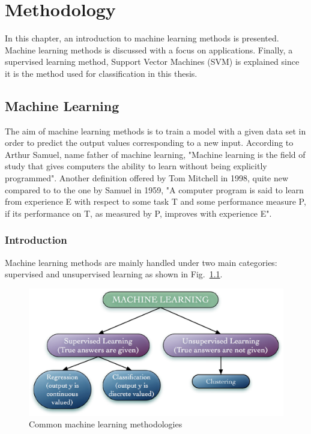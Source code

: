 \chapter{Methodology}

In this chapter, an introduction to machine learning methods is presented. 
Machine learning methods is discussed with a focus on applications.
Finally, a supervised learning method, Support Vector Machines (SVM) is explained since it is the method used for classification in this thesis.

\section{Machine Learning}

The aim of machine learning methods is to train a model with a given data set in order to predict the output values corresponding to a new input. 
According to Arthur Samuel, name father of machine learning, "Machine learning is the field of study that gives computers the ability to learn without being explicitly programmed". 
Another definition offered by Tom Mitchell in 1998, quite new compared to to the one by Samuel in 1959, "A computer program is said to learn from experience E with respect to some task T and some performance measure P, if its performance on T, as measured by P, improves with experience E".

\subsection{Introduction}
Machine learning methods are mainly handled under two main categories: supervised and unsupervised learning as shown in Fig.~\ref{fig:machineLearningMethodsSerious}. 

\begin{figure}
\begin{center}
\includegraphics[width=14cm]{figures/machineLearningMethodsSerious}    %
\caption{Common machine learning methodologies} 
\label{fig:machineLearningMethodsSerious}
\end{center}
\end{figure}

